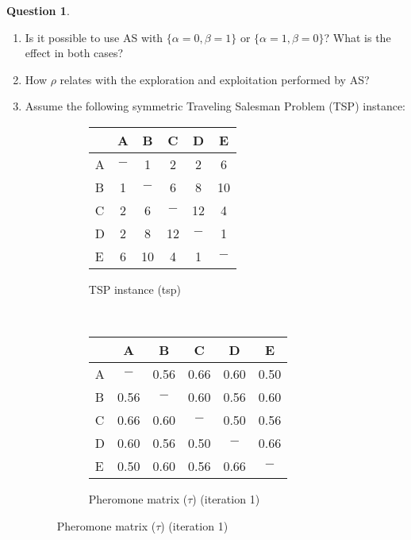 \documentclass[11pt,a4paper]{article}
\theoremstyle{definition}%
\newtheorem{Q}{Question}[] %
\begin{document}
\begin{Q}
\begin{enumerate}
 \item Is it possible to use AS with $\{\alpha=0, \beta=1\}$ or  $\{\alpha=1, \beta=0\}$? What is the effect in both cases?
 \item How $\rho$ relates with the exploration and exploitation performed by AS?
 \item Assume the following symmetric Traveling Salesman Problem (TSP)
 instance:\\
   \begin{figure}[ht]
   \begin{subfigure}{0.31\textwidth}
   \begin{tabular} {| l | c |c | c | c | c |}
   \hline
        &  A  &  B  &  C  &  D  & E   \\
    \hline
      A & $-$ &  1  &  2  &  2  & 6   \\
      B &  1  & $-$ &  6  &  8  & 10  \\  
      C &  2  &  6  & $-$ &  12 & 4   \\
      D &  2  &  8  & 12  & $-$ & 1   \\
      E &  6  & 10  &  4  &   1 & $-$  \\
    \hline
   \end{tabular}
   \caption{TSP instance (tsp)}
   \end{subfigure}
   ~~~~~~~~
   \begin{subfigure}{0.45\textwidth}
   \centering
   \begin{tabular} {| l | c |c | c | c | c |}
   \hline
        &  A  &  B  &  C  &  D  & E   \\
    \hline
      A & $-$    &  0.56  &  0.66  &  0.60  & 0.50   \\
      B &  0.56  & $-$    &  0.60  &  0.56  & 0.60  \\  
      C &  0.66  &  0.60  & $-$    &  0.50  & 0.56   \\
      D &  0.60  &  0.56  &  0.50  & $-$    & 0.66   \\
      E &  0.50  &  0.60  &  0.56  &  0.66  & $-$  \\
    \hline
   \end{tabular}
   \caption{Pheromone matrix ($\tau$) (iteration 1) }
   \end{subfigure}
   \end{figure}
   

\end{enumerate}
\end{Q}
\end{document}
